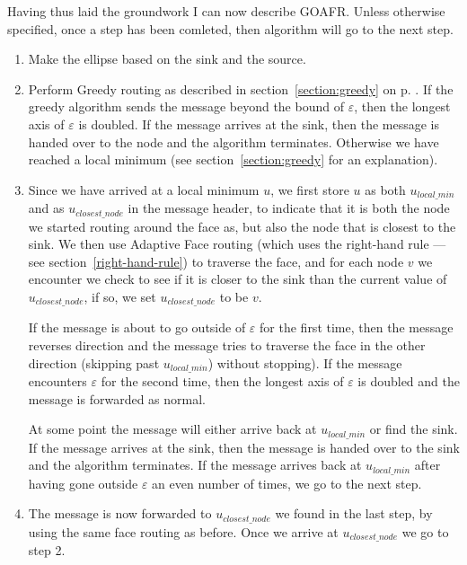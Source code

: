 Having thus laid the groundwork I can now describe GOAFR. Unless otherwise specified, once a step has been comleted, then algorithm will go to the next step.
\begin{enumerate}
\item Make the ellipse based on the sink and the source.

\item Perform Greedy routing as described in section~\ref{section:greedy} on p. \pageref{section:greedy}. If the greedy algorithm sends the message beyond the bound of $\varepsilon$, then the longest axis of $\varepsilon$ is doubled. If the message arrives at the sink, then the message is handed over to the node and the algorithm terminates. Otherwise we have reached a local minimum (see section~\ref{section:greedy} for an explanation). 

\item Since we have arrived at a local minimum $u$, we first store $u$ as both $u_{local\_min}$ and as $u_{closest\_node}$ in the message header, to indicate that it is both the node we started routing around the face as, but also the node that is closest to the sink. We then use Adaptive Face routing (which uses the right-hand rule --- see section~\ref{right-hand-rule}) to traverse the face, and for each node $v$ we encounter we check to see if it is closer to the sink than the current value of $u_{closest\_node}$, if so, we set $u_{closest\_node}$ to be $v$. 

If the message is about to go outside of $\varepsilon$ for the first time, then the message reverses direction and the message tries to traverse the face in the other direction (skipping past $u_{local\_min}$) without stopping). If the message encounters $\varepsilon$ for the second time, then the longest axis of $\varepsilon$ is doubled and the message is forwarded as normal.

At some point the message will either arrive back at $u_{local\_min}$ or find the sink. If the message arrives at the sink, then the message is handed over to the sink and the algorithm terminates. If the message arrives back at $u_{local\_min}$ after having gone outside $\varepsilon$ an even number of times, we go to the next step.

\item The message is now forwarded to $u_{closest\_node}$ we found in the last step, by using the same face routing as before. Once we arrive at $u_{closest\_node}$ we go to step 2.
\end{enumerate}

